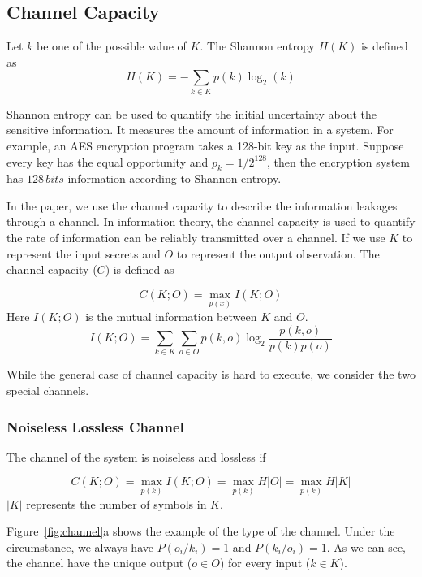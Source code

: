 \subsection{Channel Capacity}
Let $k$ be one of the possible
value of $K$. The Shannon entropy $H(K)$ is defined as
\begin{equation}\label{eq1}
  H(K) = - \sum_{k {\in} K}p(k)\log_2(k)
\end{equation}

Shannon entropy can be used to quantify the initial uncertainty about the sensitive information. It measures the amount of information in a system. For example, an AES encryption program takes a 128-bit key as the input. Suppose every key has the equal opportunity and $p_k = 1/ 2^{128}$, then the encryption system has $128 \, \mathit{bits}$ information according to Shannon entropy.


In the paper, we use the channel capacity to describe the information leakages through a channel. In information theory, the channel capacity is used to quantify the rate of information can be reliably transmitted over a channel. If we use $K$ to represent the input secrets and $O$ to represent the output observation. The channel capacity ($C$) is defined as

\begin{equation}\label{eq2}
  C(K;O) = \max_{p(x)} I(K;O)
\end{equation}
Here $I(K;O)$ is the mutual information between $K$ and $O$.
\begin{equation} \label{eq3}
  I(K;O) = \sum_{k {\in} K}{\sum_{o {\in} O}{p(k, o)\log_2\frac{p(k, o)}{p(k)p(o)}}}
\end{equation}

While the general case of channel capacity is hard to execute, we consider the two special channels.

\subsubsection{Noiseless Lossless Channel}
The channel of the system is noiseless and lossless if

\begin{equation} \label{eq:1}
  C(K;O) = \max_{p(k)} I(K;O) = \max_{p(k)} H|O| =\max_{p(k)} H|K|
\end{equation}
$|K|$ represents the number of symbols in $K$.

Figure~\ref{fig:channel}a shows the example of the type of the channel. Under the circumstance, we always have $P(o_i/k_i) = 1$ and $P(k_i/o_i) = 1$. As we can see, the channel have the unique output ($o \in O$) for every input ($k \in K$).

